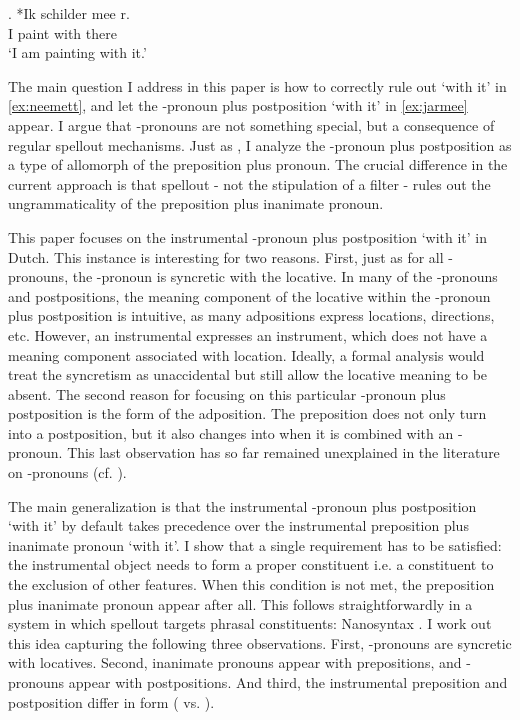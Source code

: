 \documentclass[11pt,a4paper]{article}
\begin{document}
\exg. *Ik schilder mee r.\\
 I paint with there\\
 `I am painting with it.'\label{ex:neemeer}

The main question I address in this paper is how to correctly rule out  `with it' in \ref{ex:neemett}, and let the -pronoun plus postposition  `with it' in \ref{ex:jarmee} appear. I argue that -pronouns are not something special, but a consequence of regular spellout mechanisms. Just as \citet{riemsdijk1978}, I analyze the -pronoun plus postposition as a type of allomorph of the preposition plus pronoun. The crucial difference in the current approach is that spellout - not the stipulation of a filter - rules out the ungrammaticality of the preposition plus inanimate pronoun.

This paper focuses on the instrumental -pronoun plus postposition  `with it' in Dutch. This instance is interesting for two reasons. First, just as for all -pronouns, the -pronoun is syncretic with the locative. In many of the -pronouns and postpositions, the meaning component of the locative within the -pronoun plus postposition is intuitive, as many adpositions express locations, directions, etc. However, an instrumental expresses an instrument, which does not have a meaning component associated with location. Ideally, a formal analysis would treat the syncretism as unaccidental but still allow the locative meaning to be absent.
The second reason for focusing on this particular -pronoun plus postposition is the form of the adposition. The preposition  does not only turn into a postposition, but it also changes into  when it is combined with an -pronoun. This last observation has so far remained unexplained in the literature on -pronouns (cf. \citealt{riemsdijk1978,koopman1994,abels2003diss,noonan2017dutch}).

The main generalization is that the instrumental -pronoun plus postposition  `with it' by default takes precedence over the instrumental preposition plus inanimate pronoun  `with it'. I show that a single requirement has to be satisfied: the instrumental object needs to form a proper constituent i.e. a constituent to the exclusion of other features. When this condition is not met, the preposition plus inanimate pronoun appear after all. This follows straightforwardly in a system in which spellout targets phrasal constituents: Nanosyntax \citep{starke2009}. I work out this idea capturing the following three observations. First, -pronouns are syncretic with locatives. Second, inanimate pronouns appear with prepositions, and -pronouns appear with postpositions. And third, the instrumental preposition and postposition differ in form ( vs. ).
\end{document}
